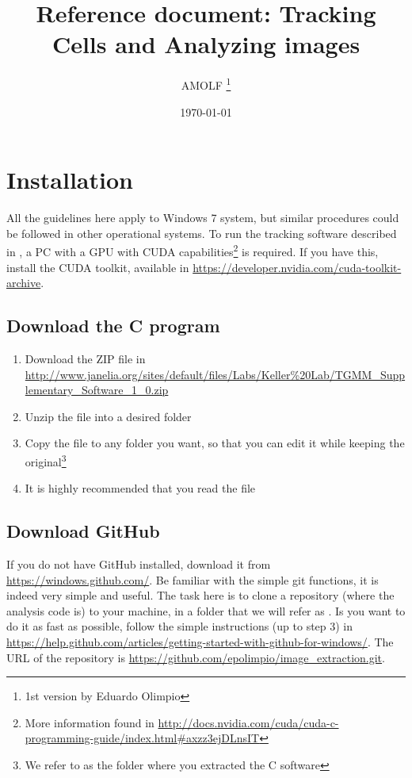 \documentclass[12pt]{article}
\title{Reference document: Tracking Cells and Analyzing images}
\author{AMOLF \footnote{1st version by Eduardo Olimpio}}
\date{\today}
\begin{document}
\maketitle

\section{Installation}

All the guidelines here apply to Windows 7 system, but similar procedures could be followed in other operational systems. To run the tracking software described in \cite{Amat2014}, a PC with a GPU with CUDA capabilities\footnote{More information found in \url{http://docs.nvidia.com/cuda/cuda-c-programming-guide/index.html#axzz3ejDLnsIT}} is required. If you have this, install the CUDA toolkit, available in \url{https://developer.nvidia.com/cuda-toolkit-archive}.

\subsection{Download the C program}

\begin{enumerate}
\item{Download the ZIP file in \url{http://www.janelia.org/sites/default/files/Labs/Keller%20Lab/TGMM_Supplementary_Software_1_0.zip}}
\item{Unzip the file into a desired folder}
\item{Copy the file  to any folder you want, so that you can edit it while keeping the original\footnote{We refer to  as the folder where you extracted the C software}}
\item{It is highly recommended that you read the  file}
\end{enumerate}

\subsection{Download GitHub}

If you do not have GitHub installed, download it from \url{https://windows.github.com/}. Be familiar with the simple git functions, it is indeed very simple and useful. The task here is to clone a repository (where the analysis code is) to your machine, in a folder that we will refer as . Is you want to do it as fast as possible, follow the simple instructions (up to step 3) in \url{https://help.github.com/articles/getting-started-with-github-for-windows/}. The URL of the repository is \url{https://github.com/epolimpio/image_extraction.git}.
\end{document}
